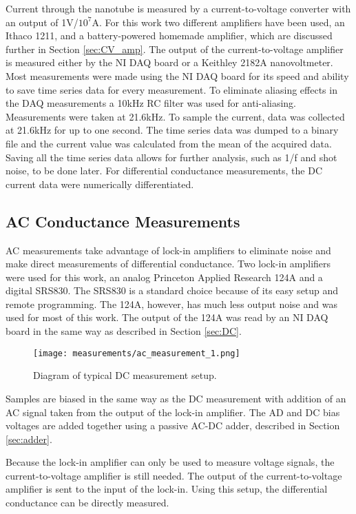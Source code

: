 Current through the nanotube is measured by a current-to-voltage converter with an output of 1V/$10^7$A. For this work two different amplifiers have been used, an Ithaco 1211, and a battery-powered homemade amplifier, which are discussed further in Section \ref{sec:CV_amp}. The output of the current-to-voltage amplifier is measured either by the NI DAQ board or a Keithley 2182A nanovoltmeter. Most measurements were made using the NI DAQ board for its speed and ability to save time series data for every measurement. To eliminate aliasing effects in the DAQ measurements a 10kHz RC filter was used for anti-aliasing. Measurements were taken at 21.6kHz. To sample the current, data was collected at 21.6kHz for up to one second. The time series data was dumped to a binary file and the current value was calculated from the mean of the acquired data. Saving all the time series data allows for further analysis, such as 1/f and shot noise, to be done later. For differential conductance measurements, the DC current data were numerically differentiated. 

\subsection{AC Conductance Measurements}

AC measurements take advantage of lock-in amplifiers to eliminate noise and make direct measurements of differential conductance. Two lock-in amplifiers were used for this work, an analog Princeton Applied Research 124A and a digital SRS830. The SRS830 is a standard choice because of its easy setup and remote programming. The 124A, however, has much less output noise and was used for most of this work. The output of the 124A was read by an NI DAQ board in the same way as described in Section \ref{sec:DC}.

\begin{figure}
    \centering
    \texttt{[image: measurements/ac\_measurement\_1.png]}
    \caption{Diagram of typical DC measurement setup.}
    \label{fig:ac_measurement}
\end{figure}

Samples are biased in the same way as the DC measurement with addition of an AC signal taken from the output of the lock-in amplifier. The AD and DC bias voltages are added together using a passive AC-DC adder, described in Section \ref{sec:adder}. 

Because the lock-in amplifier can only be used to measure voltage signals, the current-to-voltage amplifier is still needed. The output of the current-to-voltage amplifier is sent to the input of the lock-in. Using this setup, the differential conductance can be directly measured.

